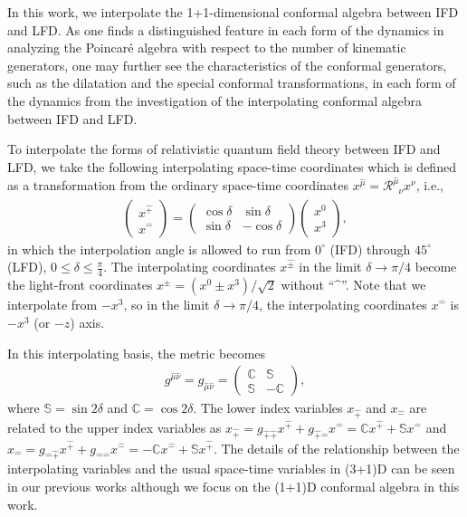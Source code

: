 \documentclass[%
 reprint,
superscriptaddress,
 amsmath,amssymb,
 aps,
]{revtex4-2}
\newcommand{\muT}{\hat{\mu}}
\newcommand{\itP}[1]{\hat{#1}}
\begin{document}
In this work, we interpolate the 1+1-dimensional conformal algebra between IFD and LFD. As one finds a distinguished feature in each form of the dynamics in analyzing the Poincar\'e algebra with respect to the number of kinematic generators, one may further see the characteristics of the conformal generators, such as the dilatation and the special conformal transformations, in each form of the dynamics from the investigation of the interpolating conformal algebra between IFD and LFD.

To interpolate the forms of relativistic quantum field theory between IFD and LFD, we take the following interpolating space-time coordinates  \cite{Ji2001, Hornbostel1992, Ji1996, Ji2012, Ji2015EM, Ji2015SP, Ji2018QED, Ji2021QCD} which is defined as a transformation from the ordinary space-time coordinates $x^{\muT}=\mathcal{R}^{\muT}_{\phantom{\mu}{\nu}}x^{\nu}$, i.e.,
\begin{align}\label{eqn:interpolation_angle_definition}
  \begin{pmatrix}
    x^{\hat{+}}\\
    x^{\hat{-}}
  \end{pmatrix}=
  \begin{pmatrix}
    \cos\delta  & \sin\delta \\
    \sin\delta  & -\cos\delta
  \end{pmatrix}
  \begin{pmatrix}
    x^{0}\\
    x^{3}
  \end{pmatrix},
\end{align}
in which the interpolation angle is allowed to run from $0^\circ$ (IFD) through $45^\circ$ (LFD), $0\le \delta \le \frac{\pi}{4}$. The interpolating coordinates $x^{\itP{\pm}}$ in the limit $\delta\rightarrow\pi/4$ become the light-front coordinates $x^{\pm}=(x^{0}\pm x^{3})/\sqrt{2}$ without  ``\textasciicircum''. Note that we interpolate from $-x^3$, so in the limit $\delta\rightarrow\pi/4$, the interpolating coordinates $x^{\itP{-}}$ is $-x^3$ (or $-z$) axis. 

 In this interpolating basis, the metric becomes
\begin{align}\label{eqn:g_munu_interpolation}
  g^{\hat{\mu}\hat{\nu}}
  = g_{\hat{\mu}\hat{\nu}}
  =
  \begin{pmatrix}
    \mathbb{C}  & \mathbb{S} \\
    \mathbb{S}  & -\mathbb{C}
  \end{pmatrix},
\end{align}
where $\mathbb{S}=\sin2\delta$ and $\mathbb{C}=\cos2\delta$. The lower index variables $x_{\hat{+}}$ and $x_{\hat{-}}$ are related to the upper index variables as $x_{\hat{+}}=g_{\hat{+}\hat{+}}x^{\hat{+}}+g_{\hat{+}\hat{-}}x^{\hat{-}}=\mathbb{C}x^{\hat{+}}+\mathbb{S}x^{\hat{-}}$ and $x_{\hat{-}}=g_{\hat{-}\hat{+}}x^{\hat{+}}+g_{\hat{-}\hat{-}}x^{\hat{-}}=-\mathbb{C}x^{\hat{-}}+\mathbb{S}x^{\hat{+}}$.
The details of the relationship between the
interpolating variables and the usual space-time variables
in (3+1)D can be seen in our previous works  \cite{Ji2001, Hornbostel1992, Ji1996, Ji2012, Ji2015EM, Ji2015SP, Ji2018QED, Ji2021QCD} although we focus on the (1+1)D conformal algebra in this work.
\end{document}

